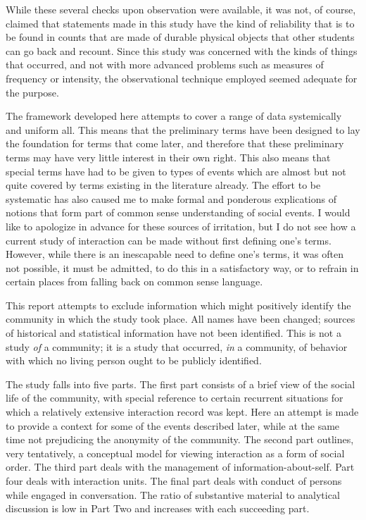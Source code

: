 \documentclass[openany,nobib]{tufte-book}
\begin{document}
\newpage While these several checks upon observation were available, it was not,
of course, claimed that statements made in this study have the kind of
reliability that is to be found in counts that are made of durable
physical objects that other students can go back and recount. Since this
study was concerned with the kinds of things that occurred, and not with
more advanced problems such as measures of frequency or intensity, the
observational technique employed seemed adequate for the purpose.

The framework developed here attempts to cover a range of data
systemically and uniform all. This means that the preliminary terms have
been designed to lay the foundation for terms that come later, and
therefore that these preliminary terms may have very little interest in
their own right. This also means that special terms have had to be given
to types of events which are almost but not quite covered by terms
existing in the literature already. The effort to be systematic has also
caused me to make formal and ponderous explications of notions that form
part of common sense understanding of social events. I would like to
apologize in advance for these sources of irritation, but I do not see
how a current study of interaction can be made without first defining
one's terms. However, while there is an inescapable need to define one's
terms, it was often not possible, it must be admitted, to do this in a
satisfactory way, or to refrain in certain places from falling back on
common sense language.

This report attempts to exclude information which might positively
identify the community in which the study took place. All names have
been changed; sources of historical and statistical information have not
been identified. This is not a study \emph{of} a community; it is a
study that occurred, \emph{in} a community, of behavior with which no
living person ought to be publicly identified.

The study falls into five parts. The first part consists of a brief view
of the social life of the community, with special reference to certain
recurrent situations for which a relatively extensive interaction record
was kept. Here an attempt is made to provide a context for some of the
events described later, while at the same time not prejudicing the
anonymity of the community. The second part outlines, very tentatively,
a conceptual model for viewing interaction as a form of social order.
The third part deals with the management of information-about-self. Part
four deals with interaction units. The final part deals with conduct of
persons while engaged in conversation. The ratio of substantive material
to analytical discussion is low in Part Two and increases with each
succeeding part.
\end{document}
